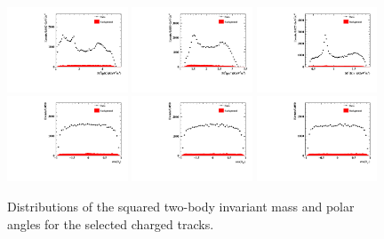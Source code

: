 \begin{figure}[H]\centering
    \includegraphics[width=0.32\textwidth]{figure/dalitz/output_data_mc_0_sideband_m2_12_2c_1.pdf}
    \includegraphics[width=0.32\textwidth]{figure/dalitz/output_data_mc_0_sideband_m2_13_2c_1.pdf}
    \includegraphics[width=0.32\textwidth]{figure/dalitz/output_data_mc_0_sideband_m2_23_2c_1.pdf}
    \includegraphics[width=0.32\textwidth]{figure/dalitz/output_data_mc_0_sideband_costheta1_1.pdf}
    \includegraphics[width=0.32\textwidth]{figure/dalitz/output_data_mc_0_sideband_costheta2_1.pdf}
    \includegraphics[width=0.32\textwidth]{figure/dalitz/output_data_mc_0_sideband_costheta3_1.pdf}
    \caption{Distributions of the squared two-body invariant mass and polar angles for the selected charged tracks.}
\label{fig:projected_plots}
\end{figure}

